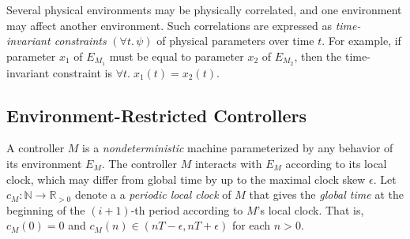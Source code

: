 Several physical environments may be physically correlated,
and one %
environment may %
affect  another environment.
Such %
correlations are %
expressed as
\emph{time-invariant constraints} $(\forall t.\, \psi)$ of physical parameters over time $t$.
For example, if %
parameter $x_1$ of $E_{M_1}$
must be equal to  parameter $x_2$ of %
$E_{M_2}$,
then the time-invariant constraint is  %
$\forall t.\; x_1(t) = x_2(t)$.




\subsection{Environment-Restricted Controllers}
\label{sec:env-res}

A controller $M$ is a \emph{nondeterministic} machine
parameterized by any behavior of its %
environment $E_M$.
%
The controller 
$M$ interacts  with %
$E_M$
according to its local clock,
which may  differ from global time by up to  
the maximal clock skew $\epsilon$.
Let $c_M : \mathbb{N} \to \mathbb{R}_{>0}$ denote a a \emph{periodic local clock} of $M$
that gives the \emph{global time} at the
beginning of the $(i+1)$-th period according to $M$'s local clock. 
That is,  $c_M(0) = 0$
and
$c_M(n) \in (n T - \epsilon, n T + \epsilon)$ for each $n > 0$.



